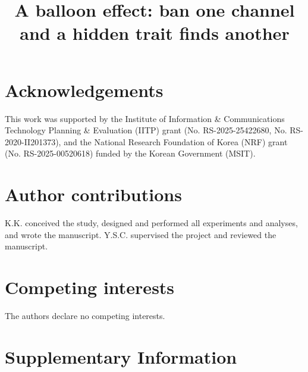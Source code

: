 \documentclass[pdflatex,sn-nature,iicol]{sn-jnl}
\begin{document}
\title[A balloon effect]{A balloon effect: ban one channel and a hidden trait finds another}

\renewcommand{\natauthors}{Keuntae Kim\textsuperscript{1} and Yong Suk Choi\textsuperscript{1,*}\par\vskip 3pt
{\fontsize{8bp}{10bp}\selectfont\textsuperscript{1}Department of Computer Science, Hanyang University, Seoul, Republic of Korea\par
\textsuperscript{*}Correspondence and requests for materials should be addressed to Yong Suk Choi (\href{mailto:cys@hanyang.ac.kr}{cys@hanyang.ac.kr}).}}



\maketitle



{\fontsize{8.5bp}{10.5bp}\selectfont


}



\section*{Acknowledgements}
This work was supported by the Institute of Information \& Communications Technology Planning \& Evaluation (IITP) grant (No. RS-2025-25422680, No. RS-2020-II201373), and the National Research Foundation of Korea (NRF) grant (No. RS-2025-00520618) funded by the Korean Government (MSIT).

\section*{Author contributions}
K.K. conceived the study, designed and performed all experiments and analyses, and wrote the manuscript. Y.S.C. supervised the project and reviewed the manuscript.

\section*{Competing interests}
The authors declare no competing interests.

\clearpage
\setcounter{table}{0}\setcounter{figure}{0}
\renewcommand{\tablename}{Extended Data Table}
\renewcommand{\figurename}{Extended Data Fig.}


\clearpage
\setcounter{table}{0}
\renewcommand{\tablename}{Supplementary Table}
\section*{Supplementary Information}

\end{document}
